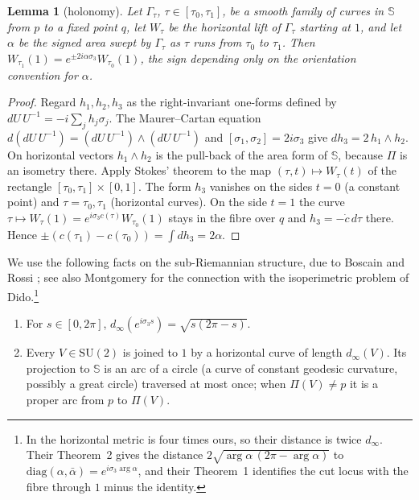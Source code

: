\documentclass[11pt]{amsart}
\newtheorem{lemma}[theorem]{Lemma}
\theoremstyle{definition}
\newcommand{\SU}{\mathrm{SU}(2)}
\newcommand{\Sp}{\mathbb{S}}
\newcommand{\dinf}{d_{\infty}}
\begin{document}
\begin{lemma}[holonomy]\label{lem:holonomy}
Let $\Gamma_\tau$, $\tau\in[\tau_0,\tau_1]$, be a smooth family of curves in $\Sp$ from $p$ to a fixed point $q$, let $W_\tau$ be the horizontal lift of $\Gamma_\tau$ starting at $1$, and let $\alpha$ be the signed area swept by $\Gamma_\tau$ as $\tau$ runs from $\tau_0$ to $\tau_1$. Then $W_{\tau_1}(1)=e^{\pm2i\alpha\sigma_3}W_{\tau_0}(1)$, the sign depending only on the orientation convention for $\alpha$.
\end{lemma}

\begin{proof}
Regard $h_1,h_2,h_3$ as the right-invariant one-forms defined by $dU\,U^{-1}=-i\sum_jh_j\sigma_j$. The Maurer--Cartan equation $d(dU\,U^{-1})=(dU\,U^{-1})\wedge(dU\,U^{-1})$ and $[\sigma_1,\sigma_2]=2i\sigma_3$ give $dh_3=2\,h_1\wedge h_2$. On horizontal vectors $h_1\wedge h_2$ is the pull-back of the area form of $\Sp$, because $\Pi$ is an isometry there. Apply Stokes' theorem to the map $(\tau,t)\mapsto W_\tau(t)$ of the rectangle $[\tau_0,\tau_1]\times[0,1]$. The form $h_3$ vanishes on the sides $t=0$ (a constant point) and $\tau=\tau_0,\tau_1$ (horizontal curves). On the side $t=1$ the curve $\tau\mapsto W_\tau(1)=e^{i\sigma_3c(\tau)}W_{\tau_0}(1)$ stays in the fibre over $q$ and $h_3=-\dot c\,d\tau$ there. Hence $\pm(c(\tau_1)-c(\tau_0))=\int dh_3=2\alpha$.
\end{proof}

We use the following facts on the sub-Riemannian structure, due to Boscain and Rossi \cite{BR08}; see also Montgomery \cite[Chapter~1]{Mon02} for the connection with the isoperimetric problem of Dido.\footnote{In \cite{BR08} the horizontal metric is four times ours, so their distance is twice $\dinf$. Their Theorem~2 gives the distance $2\sqrt{\arg\alpha\,(2\pi-\arg\alpha)}$ to $\mathrm{diag}(\alpha,\bar\alpha)=e^{i\sigma_3\arg\alpha}$, and their Theorem~1 identifies the cut locus with the fibre through $1$ minus the identity.}

\begin{enumerate}
\item[(F1)] For $s\in[0,2\pi]$, $\dinf(e^{i\sigma_3s})=\sqrt{s(2\pi-s)}$.
\item[(F2)] Every $V\in\SU$ is joined to $1$ by a horizontal curve of length $\dinf(V)$. Its projection to $\Sp$ is an arc of a circle (a curve of constant geodesic curvature, possibly a great circle) traversed at most once; when $\Pi(V)\neq p$ it is a proper arc from $p$ to $\Pi(V)$.
\end{enumerate}
\end{document}
